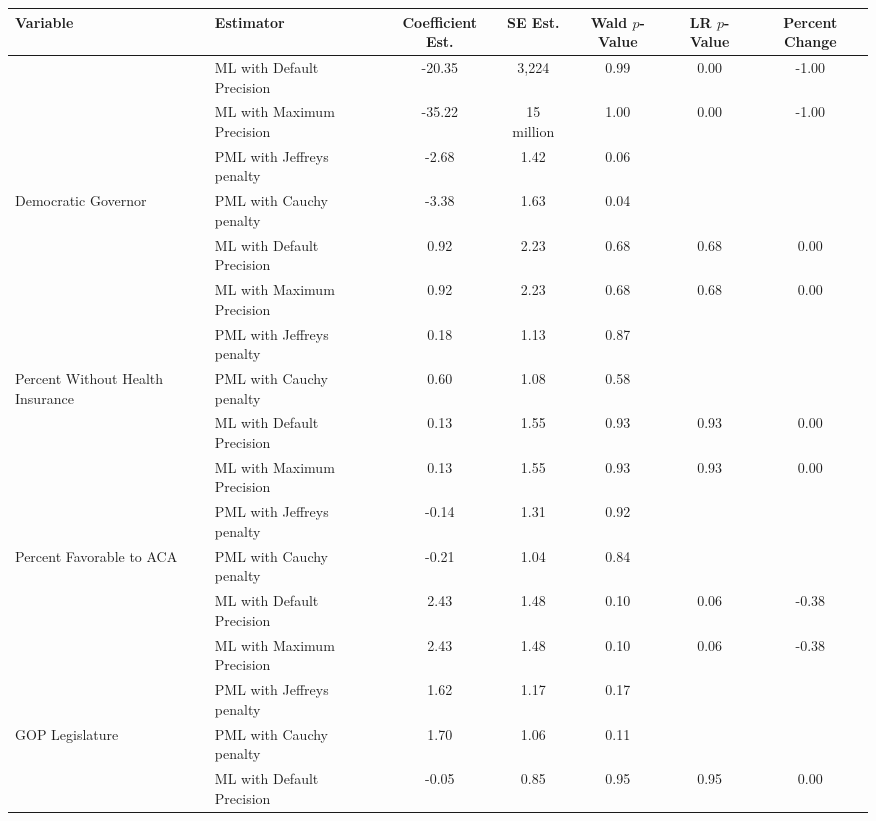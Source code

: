 
\begin{tabular}{llccccc}
\toprule
Variable & Estimator & Coefficient Est. & SE Est. & Wald $p$-Value & LR $p$-Value & Percent Change\\
\midrule
 & ML with Default Precision & -20.35 & 3,224 & 0.99 & 0.00 & -1.00\\

 & ML with Maximum Precision & -35.22 & 15 million & 1.00 & 0.00 & -1.00\\

 & PML with Jeffreys penalty & -2.68 & 1.42 & 0.06 &  & \\

\multirow{-4}{*}{\raggedright\arraybackslash Democratic Governor} & PML with Cauchy penalty & -3.38 & 1.63 & 0.04 &  & \\
\cmidrule{1-7}
 & ML with Default Precision & 0.92 & 2.23 & 0.68 & 0.68 & 0.00\\

 & ML with Maximum Precision & 0.92 & 2.23 & 0.68 & 0.68 & 0.00\\

 & PML with Jeffreys penalty & 0.18 & 1.13 & 0.87 &  & \\

\multirow{-4}{*}{\raggedright\arraybackslash Percent Without Health Insurance} & PML with Cauchy penalty & 0.60 & 1.08 & 0.58 &  & \\
\cmidrule{1-7}
 & ML with Default Precision & 0.13 & 1.55 & 0.93 & 0.93 & 0.00\\

 & ML with Maximum Precision & 0.13 & 1.55 & 0.93 & 0.93 & 0.00\\

 & PML with Jeffreys penalty & -0.14 & 1.31 & 0.92 &  & \\

\multirow{-4}{*}{\raggedright\arraybackslash Percent Favorable to ACA} & PML with Cauchy penalty & -0.21 & 1.04 & 0.84 &  & \\
\cmidrule{1-7}
 & ML with Default Precision & 2.43 & 1.48 & 0.10 & 0.06 & -0.38\\

 & ML with Maximum Precision & 2.43 & 1.48 & 0.10 & 0.06 & -0.38\\

 & PML with Jeffreys penalty & 1.62 & 1.17 & 0.17 &  & \\

\multirow{-4}{*}{\raggedright\arraybackslash GOP Legislature} & PML with Cauchy penalty & 1.70 & 1.06 & 0.11 &  & \\
\cmidrule{1-7}
 & ML with Default Precision & -0.05 & 0.85 & 0.95 & 0.95 & 0.00\\


\end{tabular}
